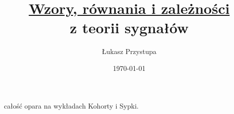 \documentclass[12pt]{article}
\title{\underline{Wzory, równania i zależności}\\\textbf{z teorii sygnałów}}
\author{Łukasz Przystupa}
\date{\today}
\begin{document}
    \maketitle
    całość opara na wykładach Kohorty i Sypki.
    \newpage

    
    
    
    
    
    
    
    
    
\end{document}

